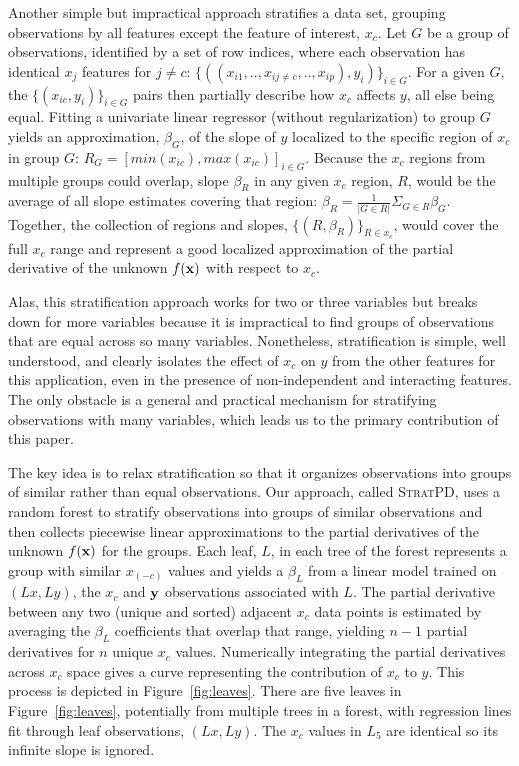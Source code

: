 \documentclass[12pt]{article}
\newcommand{\figref}[1]{Figure~\ref{#1}}
\newcommand{\spd}{\fontfamily{cmr}\textsc{\small StratPD}}
\begin{document}
Another simple but impractical approach stratifies a data set, grouping observations by all features except the feature of interest, $x_c$.  Let $G$ be a group of observations, identified by a set of row indices, where each observation has identical $x_{j}$ features for $j \neq c$: $\{((x_{i1}, .., x_{ij \neq c}, .., x_{ip}),  y_i)\}_{i \in G}$. For a given $G$, the $\{(x_{ic},  y_i)\}_{i \in G}$ pairs then partially describe how $x_c$ affects $y$, all else being equal.  Fitting a univariate linear regressor (without regularization) to group $G$ yields an approximation, $\beta_G$, of the slope of $y$ localized to the specific region of $x_c$ in group $G$: $R_G = [min(x_{ic}), max(x_{ic})]_{i \in G}$.   Because the $x_c$ regions from multiple groups could overlap, slope $\beta_R$ in any given $x_c$ region, $R$, would be the average of all slope estimates covering that region: $\beta_R = \frac{1}{|G \in R|}\Sigma_{G \in R}\beta_G$. Together, the collection of regions and slopes, $\{(R, \beta_R)\}_{R \in x_c}$, would cover the full $x_c$ range and represent a good localized approximation of the partial derivative of the unknown $f(\bf x)$ with respect to $x_c$.

Alas, this stratification approach works for two or three variables but breaks down for more variables because it is impractical to find groups of observations that are equal across so many variables.  Nonetheless, stratification is simple, well understood, and clearly isolates the effect of $x_c$ on $y$ from the other features for this application, even in the presence of non-independent and interacting features.  The only obstacle is a general and practical mechanism for stratifying observations with many variables, which leads us to the primary contribution of this paper.

The key idea is to relax stratification so that it organizes observations into groups of similar rather than equal observations.  Our approach, called \spd, uses a random forest to stratify observations into  groups of similar observations and then collects piecewise linear approximations to the partial derivatives of the unknown $f(\bf x)$ for the groups. Each leaf, $L$, in each tree of the forest represents a group with similar $x_{(-c)}$ values and yields a $\beta_L$ from a linear model trained on $(Lx, Ly)$, the $x_c$ and $\bf y$ observations associated with $L$.  The partial derivative between any two (unique and sorted) adjacent $x_c$ data points is estimated by averaging the $\beta_L$ coefficients that overlap that range, yielding $n-1$ partial derivatives for $n$ unique $x_c$ values.  Numerically integrating the partial derivatives across $x_c$ space gives a curve representing the contribution of $x_c$ to $y$. This process is depicted in \figref{fig:leaves}. There are five leaves in \figref{fig:leaves}, potentially from multiple trees in a forest, with regression lines fit through leaf observations, $(Lx, Ly)$. The $x_c$ values in $L_5$ are identical so its infinite slope is ignored.
\end{document}
